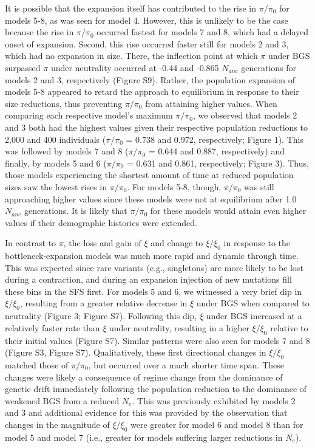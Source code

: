 \documentclass[9pt,twocolumn,twoside]{rilabRxiv}
\begin{document}
It is possible that the expansion itself has contributed to the rise in
$\pi/\pi_0$ for models 5-8, as was seen for model 4. However,
this is unlikely to be the case because the rise in $\pi/\pi_0$
occurred fastest for models 7 and 8, which had a delayed onset of
expansion. Second, this rise occurred faster still for models 2 and 3,
which had no expansion in size. There, the inflection point at which $\pi$
under BGS surpassed $\pi$ under neutrality occurred at -0.44 and -0.865
$N_{anc}$ generations for models 2 and 3, respectively
(Figure S9). Rather, the population expansion of models 5-8 appeared to
retard the approach to equilibrium in response to their size reductions,
thus preventing $\pi/\pi_0$ from attaining higher values. When
comparing each respective model's maximum $\pi/\pi_0$, we
observed that models 2 and 3 both had the highest values given their
respective population reductions to 2,000 and 400 individuals
($\pi/\pi_0$ = 0.738 and 0.972, respectively; Figure 1). This
was followed by models 7 and 8 ($\pi/\pi_0$ = 0.644 and 0.887,
respectively) and finally, by models 5 and 6 ($\pi/\pi_0$ =
0.631 and 0.861, respectively; Figure 3). Thus, those models
experiencing the shortest amount of time at reduced population sizes saw
the lowest rises in $\pi/\pi_0$. For models 5-8, though,
$\pi/\pi_0$ was still approaching higher values since these
models were not at equilibrium after 1.0 $N_{anc}$
generations. It is likely that $\pi/\pi_0$ for these models
would attain even higher values if their demographic histories were
extended.

In contrast to $\pi$, the loss and gain of $\xi$ and change to
$\xi/\xi_0$ in response to the bottleneck-expansion models was
much more rapid and dynamic through time. This was expected since rare
variants (e.g., singletons) are more likely to be lost during a
contraction, and during an expansion injection of new mutations fill
these bins in the SFS first. For models 5 and 6, we witnessed a very
brief dip in $\xi/\xi_0$, resulting from a greater relative
decrease in $\xi$ under BGS when compared to neutrality (Figure 3; Figure
S7). Following this dip, $\xi$ under BGS increased at a relatively faster
rate than $\xi$ under neutrality, resulting in a higher $\xi/\xi_0$
relative to their initial values (Figure S7). Similar patterns were also
seen for models 7 and 8 (Figure S3, Figure S7). Qualitatively, these
first directional changes in $\xi/\xi_0$ matched those of
$\pi/\pi_0$, but occurred over a much shorter time span. These
changes were likely a consequence of regime change from the dominance of
genetic drift immediately following the population reduction to the
dominance of weakened BGS from a reduced $N_e$. This
was previously exhibited by models 2 and 3 and additional evidence for
this was provided by the observation that changes in the magnitude of
$\xi/\xi_0$ were greater for model 6 and model 8 than for model
5 and model 7 (i.e., greater for models suffering larger reductions in
$N_e$).
\end{document}
